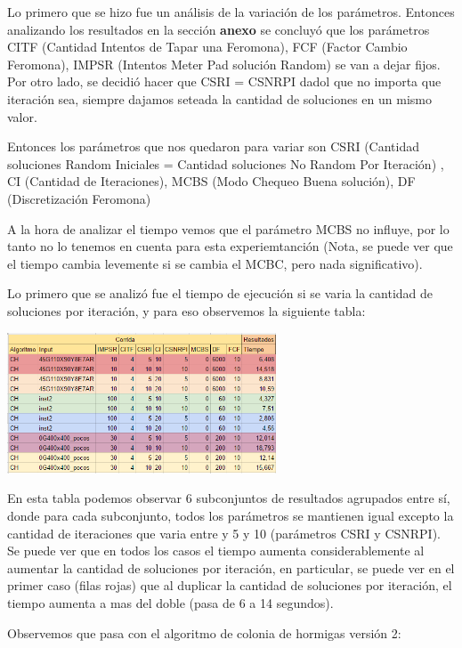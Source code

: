 				

Lo primero que se hizo fue un an\'alisis de la variaci\'on de los par\'ametros. Entonces analizando los resultados en la secci\'on \textbf{anexo} se concluy\'o que los par\'ametros CITF (Cantidad Intentos de Tapar una Feromona), FCF (Factor Cambio Feromona), IMPSR (Intentos Meter Pad soluci\'on Random) se van a dejar fijos. Por otro lado, se decidi\'o hacer que CSRI = CSNRPI dadol que no importa que iteraci\'on sea, siempre dajamos seteada la cantidad de soluciones en un mismo valor. 

Entonces los par\'ametros que nos quedaron para variar son CSRI (Cantidad soluciones Random Iniciales = Cantidad soluciones No Random Por Iteraci\'on) , CI (Cantidad de Iteraciones), MCBS (Modo Chequeo Buena soluci\'on), DF (Discretizaci\'on Feromona)

A la hora de analizar el tiempo vemos que el par\'ametro MCBS no influye, por lo tanto no lo tenemos en cuenta para esta experiemtanci\'on (Nota, se puede ver que el tiempo cambia levemente si se cambia el MCBC, pero nada significativo). 

Lo primero que se analiz\'o fue el tiempo de ejecuci\'on si se varia la cantidad de soluciones por iteraci\'on, y para eso observemos la siguiente tabla:

\begin{center}
\includegraphics[width=0.6\textwidth]{imagenes/tabla1}
\end{center}

En esta tabla podemos observar 6 subconjuntos de resultados agrupados entre s\'i, donde para cada subconjunto, todos los par\'ametros se mantienen igual excepto la cantidad de iteraciones que varia entre y 5 y 10 (par\'ametros CSRI y CSNRPI). Se puede ver que en todos los casos el tiempo aumenta considerablemente al aumentar la cantidad de soluciones por iteraci\'on, en particular, se puede ver en el primer caso (filas rojas) que al duplicar la cantidad de soluciones por iteraci\'on, el tiempo aumenta a mas del doble (pasa de 6 a 14 segundos).

Observemos que pasa con el algoritmo de colonia de hormigas versi\'on 2:

